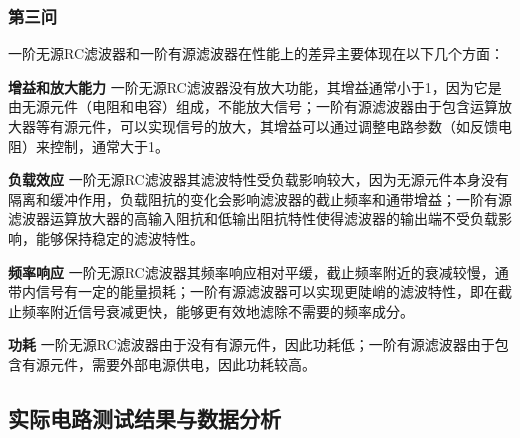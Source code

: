 \documentclass[./测控三级项目.tex]{subfiles} %
\begin{document}
		\subsubsection{第三问}
			一阶无源RC滤波器和一阶有源滤波器在性能上的差异主要体现在以下几个方面：\par
			\textbf{增益和放大能力}\qquad
			一阶无源RC滤波器没有放大功能，其增益通常小于1，因为它是由无源元件（电阻和电容）组成，不能放大信号；一阶有源滤波器由于包含运算放大器等有源元件，可以实现信号的放大，其增益可以通过调整电路参数（如反馈电阻）来控制，通常大于1。\par
			\textbf{负载效应}\qquad
			一阶无源RC滤波器其滤波特性受负载影响较大，因为无源元件本身没有隔离和缓冲作用，负载阻抗的变化会影响滤波器的截止频率和通带增益；一阶有源滤波器运算放大器的高输入阻抗和低输出阻抗特性使得滤波器的输出端不受负载影响，能够保持稳定的滤波特性。\par
			\textbf{频率响应}\qquad
			一阶无源RC滤波器其频率响应相对平缓，截止频率附近的衰减较慢，通带内信号有一定的能量损耗；一阶有源滤波器可以实现更陡峭的滤波特性，即在截止频率附近信号衰减更快，能够更有效地滤除不需要的频率成分。\par
			\textbf{功耗}\qquad
			一阶无源RC滤波器由于没有有源元件，因此功耗低；一阶有源滤波器由于包含有源元件，需要外部电源供电，因此功耗较高。
			
	\subsection{实际电路测试结果与数据分析}
\end{document}
